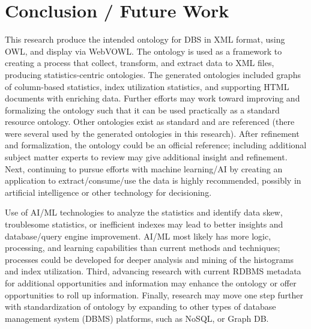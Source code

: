 \documentclass[sigconf]{acmart}
\begin{document}
\section{Conclusion / Future Work}
This research produce the intended ontology for DBS in XML format,
using OWL, and display via WebVOWL. The ontology is used as a framework
to creating a process that collect, transform, and extract data to XML files, producing statistics-centric ontologies. The generated ontologies included graphs of column-based statistics, index utilization statistics, and supporting HTML documents with enriching data. Further efforts may work toward improving and formalizing the ontology such that it can be used practically as a standard resource ontology. Other ontologies exist as standard and are referenced (there were several used by the generated ontologies in this research). After refinement and formalization, the ontology could be an official reference; including additional subject matter experts to review may give additional insight and refinement. Next, continuing to pursue efforts with machine learning/AI by creating an application to extract/consume/use the data is highly recommended, possibly in artificial intelligence or other technology for decisioning. 

Use of AI/ML technologies to analyze the statistics and identify data skew, troublesome statistics, or inefficient indexes may lead to better insights and database/query engine improvement. AI/ML most likely has more logic, processing, and learning capabilities than current methods and techniques; processes could be developed for deeper analysis and mining of the histograms and index utilization. Third, advancing research with current RDBMS metadata for additional opportunities and information may enhance the ontology or offer opportunities to roll up information. Finally, research may move one step further with standardization of ontology by expanding to other types of database management system (DBMS) platforms, such as NoSQL, or Graph DB. 






\end{document}
